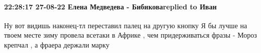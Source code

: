  
 
 
 
 

\paragraph{22:28:17 27-08-22 Елена Медведева - Бибиковаreplied to Иван}

Ну вот видишь наконец-тл переставил палец на другую кнопку Я бы лучше на твоем
месте зиму провела всетаки в Африке , чем придерживаться фразы - Мороз крепчал
, а фраера держали марку
